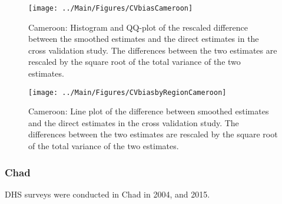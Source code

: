 \documentclass[12pt]{article}\usepackage[]{graphicx}\usepackage[]{color}
\newenvironment{knitrout}{}{} %
\begin{document}
\begin{knitrout}
\color{fgcolor}\begin{figure}[bht]

{\centering \texttt{[image: ../Main/Figures/CVbiasCameroon]} 

}

\caption[Cameroon]{Cameroon: Histogram and QQ-plot of the rescaled difference between the smoothed estimates and the direct estimates in the cross validation study. The differences between the two estimates are rescaled by the square root of the total variance of the two estimates.}\label{fig:unnamed-chunk-49}
\end{figure}


\end{knitrout}

\begin{knitrout}
\color{fgcolor}\begin{figure}[bht]

{\centering \texttt{[image: ../Main/Figures/CVbiasbyRegionCameroon]} 

}

\caption[Cameroon]{Cameroon: Line plot of the difference between smoothed estimates and the direct estimates in the cross validation study. The differences between the two estimates are rescaled by the square root of the total variance of the two estimates.}\label{fig:unnamed-chunk-50}
\end{figure}


\end{knitrout}


\clearpage
\subsubsection{Chad}





DHS surveys were conducted in Chad in 2004, and 2015.
\end{document}
